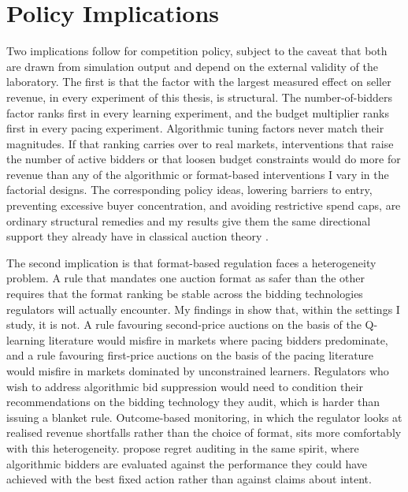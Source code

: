 \section{Policy Implications}
\label{sec:policy}

Two implications follow for competition policy, subject to the caveat that both are drawn from simulation output and depend on the external validity of the laboratory. The first is that the factor with the largest measured effect on seller revenue, in every experiment of this thesis, is structural. The number-of-bidders factor ranks first in every learning experiment, and the budget multiplier ranks first in every pacing experiment. Algorithmic tuning factors never match their magnitudes. If that ranking carries over to real markets, interventions that raise the number of active bidders or that loosen budget constraints would do more for revenue than any of the algorithmic or format-based interventions I vary in the factorial designs. The corresponding policy ideas, lowering barriers to entry, preventing excessive buyer concentration, and avoiding restrictive spend caps, are ordinary structural remedies and my results give them the same directional support they already have in classical auction theory \citep{BulowKlemperer1996}.

The second implication is that format-based regulation faces a heterogeneity problem. A rule that mandates one auction format as safer than the other requires that the format ranking be stable across the bidding technologies regulators will actually encounter. My findings in  show that, within the settings I study, it is not. A rule favouring second-price auctions on the basis of the Q-learning literature would misfire in markets where pacing bidders predominate, and a rule favouring first-price auctions on the basis of the pacing literature would misfire in markets dominated by unconstrained learners. Regulators who wish to address algorithmic bid suppression would need to condition their recommendations on the bidding technology they audit, which is harder than issuing a blanket rule. Outcome-based monitoring, in which the regulator looks at realised revenue shortfalls rather than the choice of format, sits more comfortably with this heterogeneity. \citet{Hartline2024} propose regret auditing in the same spirit, where algorithmic bidders are evaluated against the performance they could have achieved with the best fixed action rather than against claims about intent.

